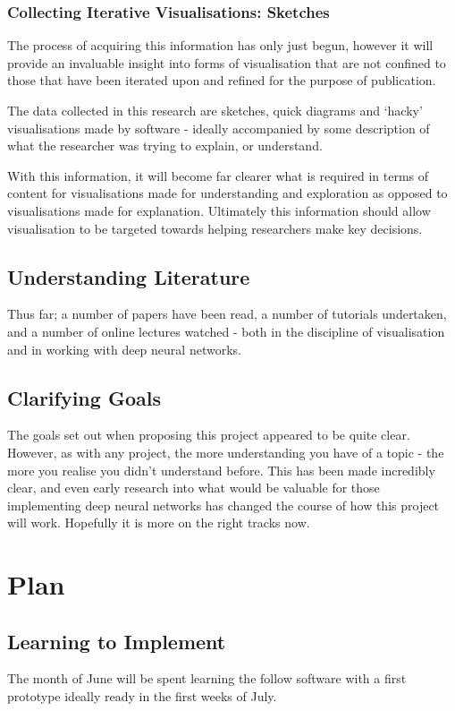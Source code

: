 \documentclass[a4paper,11pt,titlepage]{article}
\begin{document}
		\subsubsection{Collecting Iterative Visualisations: Sketches}
		The process of acquiring this information has only just begun, however it will provide an invaluable insight into forms of visualisation that are not confined to those that have been iterated upon and refined for the purpose of publication. 
		\par 
		The data collected in this research are sketches, quick diagrams and `hacky' visualisations made by software - ideally accompanied by some description of what the researcher was trying to explain, or understand.
		\par 
		With this information, it will become far clearer what is required in terms of content for visualisations made for understanding and exploration as opposed to visualisations made for explanation. Ultimately this information should allow visualisation to be targeted towards helping researchers make key decisions. 
	\subsection{Understanding Literature}
	Thus far; a number of papers have been read, a number of tutorials undertaken, and a number of online lectures watched - both in the discipline of visualisation and in working with deep neural networks.
	\subsection{Clarifying Goals}
	The goals set out when proposing this project appeared to be quite clear. However, as with any project, the more understanding you have of a topic - the more you realise you didn't understand before. This has been made incredibly clear, and even early research into what would be valuable for those implementing deep neural networks has changed the course of how this project will work. Hopefully it is more on the right tracks now.

\clearpage
\section{Plan}

	\subsection{Learning to Implement}
	The month of June will be spent learning the follow software with a first prototype ideally ready in the first weeks of July.
\end{document}
